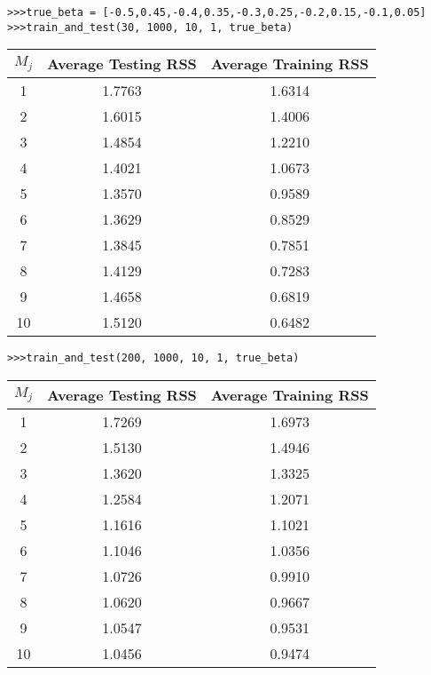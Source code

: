 \documentclass{article}
\begin{document}
\begin{lstlisting}
>>>true_beta = [-0.5,0.45,-0.4,0.35,-0.3,0.25,-0.2,0.15,-0.1,0.05]
>>>train_and_test(30, 1000, 10, 1, true_beta)
\end{lstlisting}

\begin{center}
\begin{tabular}{ c | c c}
$M_j$ & Average Testing RSS & Average Training RSS \\
\hline
1 & 1.7763 & 1.6314 \\
2 & 1.6015 & 1.4006 \\
3 & 1.4854 & 1.2210 \\
4 & 1.4021 & 1.0673 \\
5 & 1.3570 & 0.9589 \\
6 & 1.3629 & 0.8529 \\
7 & 1.3845 & 0.7851 \\
8 & 1.4129 & 0.7283 \\
9 & 1.4658 & 0.6819 \\
10 & 1.5120 & 0.6482 \\
\end{tabular}
\end{center}

\begin{lstlisting}
>>>train_and_test(200, 1000, 10, 1, true_beta)
\end{lstlisting}

\begin{center}
\begin{tabular}{ c | c c}
$M_j$ & Average Testing RSS & Average Training RSS \\
\hline
1 & 1.7269 & 1.6973 \\
2 & 1.5130 & 1.4946 \\
3 & 1.3620 & 1.3325 \\
4 & 1.2584 & 1.2071 \\
5 & 1.1616 & 1.1021 \\
6 & 1.1046 & 1.0356 \\
7 & 1.0726 & 0.9910 \\
8 & 1.0620 & 0.9667 \\
9 & 1.0547 & 0.9531 \\
10 & 1.0456 & 0.9474 \\
\end{tabular}
\end{center}
\end{document}
